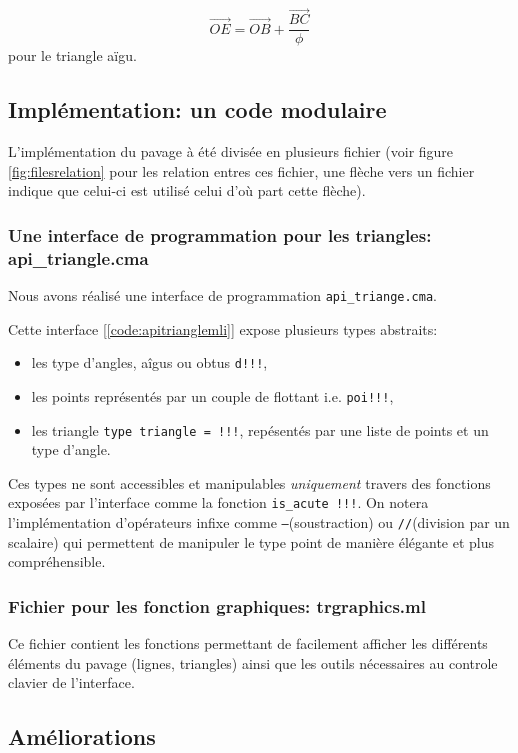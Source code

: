 \documentclass[a4paper,13pt]{article}
\begin{document}
\[ \vec{OE} = \vec{OB} + \frac{\vec{BC}}{\phi}\]
pour le triangle aïgu.
\subsection{Implémentation: un code modulaire}

L'implémentation du pavage à été divisée en plusieurs fichier (voir figure \ref{fig:filesrelation} pour les relation entres ces fichier, une flèche vers un fichier indique que celui-ci est utilisé celui d'où part cette flèche).



\subsubsection{Une interface de programmation pour les triangles: api\_triangle.cma}
Nous avons réalisé une interface de programmation \texttt{api_triange.cma}.

Cette interface [\ref{code:apitrianglemli}] expose plusieurs types abstraits:
\begin{itemize}
	\item les type d'angles, aîgus ou obtus \texttt{d!!!},
	\item les points représentés par un couple de flottant i.e. \texttt{poi!!!},
	\item les triangle \texttt{type triangle = !!!}, repésentés par une liste de points et un type d'angle.
\end{itemize}
Ces types ne sont accessibles et manipulables \emph{uniquement} travers des fonctions exposées par l'interface comme la fonction \texttt{is_acute !!!}. On notera l'implémentation d'opérateurs infixe comme \texttt{--}(soustraction) ou \texttt{//}(division par un scalaire) qui permettent de manipuler le type point de manière élégante et plus compréhensible.

\subsubsection{Fichier pour les fonction graphiques: trgraphics.ml}
Ce fichier contient les fonctions permettant de facilement afficher les différents éléments du pavage (lignes, triangles) ainsi que les outils nécessaires au controle clavier de l'interface.

\subsection{Améliorations}
\end{document}
